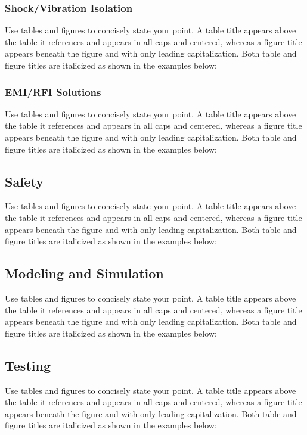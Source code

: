 \documentclass[12pt, letterpaper]{article}
\begin{document}
\subsubsection{Shock/Vibration Isolation}
Use tables and figures to concisely state your point. A table title appears above the table it references and appears in all caps and centered, whereas a figure title appears beneath the figure and with only leading capitalization. Both table and figure titles are italicized as shown in the examples below:

\subsubsection{EMI/RFI Solutions}
Use tables and figures to concisely state your point. A table title appears above the table it references and appears in all caps and centered, whereas a figure title appears beneath the figure and with only leading capitalization. Both table and figure titles are italicized as shown in the examples below:

\subsection{Safety}
Use tables and figures to concisely state your point. A table title appears above the table it references and appears in all caps and centered, whereas a figure title appears beneath the figure and with only leading capitalization. Both table and figure titles are italicized as shown in the examples below:

\subsection{Modeling and Simulation}
Use tables and figures to concisely state your point. A table title appears above the table it references and appears in all caps and centered, whereas a figure title appears beneath the figure and with only leading capitalization. Both table and figure titles are italicized as shown in the examples below:

\subsection{Testing}
Use tables and figures to concisely state your point. A table title appears above the table it references and appears in all caps and centered, whereas a figure title appears beneath the figure and with only leading capitalization. Both table and figure titles are italicized as shown in the examples below:
\end{document}

